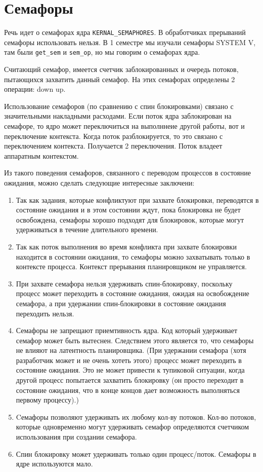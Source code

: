 \section{Семафоры}

Речь идет о семафорах ядра \verb|KERNAL_SEMAPHORES|. В обработчиках прерываний семафоры использовать нельзя. 
В 1 семестре мы изучали семафоры SYSTEM V, там были \verb|get_sem| и \verb|sem_op|, но мы говорим о семафорах ядра. 

Считающий семафор, имеется счетчик заблокированных и очередь потоков, пытающихся захватить данный семафор. На этих семафорах определены 2 операции: down up.

 

Использование семафоров (по сравнению с спин блокировками)  связано с значительными накладными расходами. 
Если поток ядра заблокирован на семафоре, то ядро может переключиться на выполннеие другой работы, вот и переключение контекста. Когда поток разблокируется, то это связано с переключением контекста.  Получается 2 переключения. Поток владеет аппаратным контекстом.

Из такого поведения семафоров, связанного с переводом процессов в состояние ожидания, можно сделать следующие интересные заключени: \cite{Lav_Linux_kernel}
\begin{enumerate}
	\item Так как задания, которые конфликтуют при захвате блокировки, переводятся в состояние ожидания и в этом состоянии ждут, пока блокировка не будет освобождена, семафоры хорошо подходят для блокировок, которые могут удерживаться в течение длительного времени.
	\item Так как поток выполнения во время конфликта при захвате блокировки находится в состоянии ожидания, то семафоры можно захватывать только в контексте процесса. Контекст прерывания планировщиком не управляется.
	\item  При захвате семафора нельзя удерживать спин-блокировку, поскольку процесс может переходить в состояние ожидания, ожидая на освобождение семафора, а при удержании спин-блокировки в состояние ожидания переходить нельзя.
	\item Семафоры не запрещают приемтивность ядра. Код который удерживает семафор может быть вытеснен.  Следствием этого является то, что семафоры не влияют на латентность планировщика. (При удержании семафора (хотя разработчик может и не очень хотеть этого) процесс может переходить в состояние ожидания. Это не может привести к тупиковой ситуации, когда другой процесс попытается захватить блокировку (он просто переходит в состояние ожидания, что в конце концов дает возможность выполняться первому процессу).)
	\item Cемафоры позволяют удерживать их любому кол-ву потоков.  Кол-во потоков, которые одновременно могут удерживать семафор определяются счетчиком использования при создании семафора.
	\item Спин блокировку может удерживать только один процесс/поток. Семафоры в ядре используются мало.
\end{enumerate}

